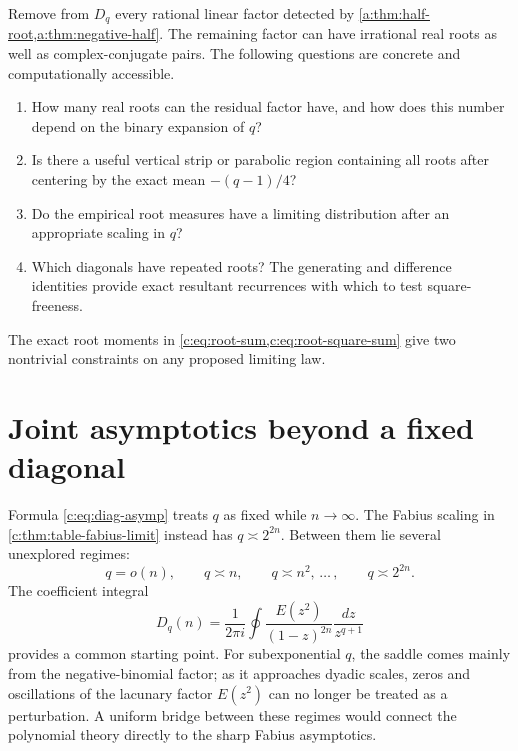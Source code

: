 \documentclass[11pt,a4paper,oneside,openany]{book}
\numberwithin{equation}{chapter}
\theoremstyle{definition}
\theoremstyle{remark}
\newcommand{\K}{E}
\newcommand{\Diag}{D}
\begin{document}
Remove from \(\Diag_q\) every rational linear factor detected by
\cref{a:thm:half-root,a:thm:negative-half}.  The remaining factor can
have irrational real roots as well as complex-conjugate pairs.  The
following questions are concrete and computationally accessible.

\begin{enumerate}[leftmargin=2.2em]
\item How many real roots can the residual factor have, and how does this
number depend on the binary expansion of \(q\)?
\item Is there a useful vertical strip or parabolic region containing all
roots after centering by the exact mean \(-(q-1)/4\)?
\item Do the empirical root measures have a limiting distribution after an
appropriate scaling in \(q\)?
\item Which diagonals have repeated roots?  The generating and difference
identities provide exact resultant recurrences with which to test
square-freeness.
\end{enumerate}

The exact root moments in \cref{c:eq:root-sum,c:eq:root-square-sum} give two
nontrivial constraints on any proposed limiting law.

\section{Joint asymptotics beyond a fixed diagonal}

Formula \cref{c:eq:diag-asymp} treats \(q\) as fixed while \(n\to\infty\).
The Fabius scaling in \cref{c:thm:table-fabius-limit} instead has
\(q\asymp2^{2n}\).  Between them lie several unexplored regimes:
\begin{equation}
 q=o(n),\qquad q\asymp n,\qquad q\asymp n^2,
 \,\ldots\,,\qquad q\asymp2^{2n}.                         \label{c:eq:scaling-regimes}
\end{equation}
The coefficient integral
\begin{equation}
 \Diag_q(n)=\frac{1}{2\pi i}\oint
  \frac{\K(z^2)}{(1-z)^{2n}}\frac{dz}{z^{q+1}}           \label{c:eq:diag-Cauchy}
\end{equation}
provides a common starting point.  For subexponential \(q\), the saddle
comes mainly from the negative-binomial factor; as it approaches dyadic
scales, zeros and oscillations of the lacunary factor \(\K(z^2)\) can no
longer be treated as a perturbation.  A uniform bridge between these
regimes would connect the polynomial theory directly to the sharp Fabius
asymptotics.
\end{document}
